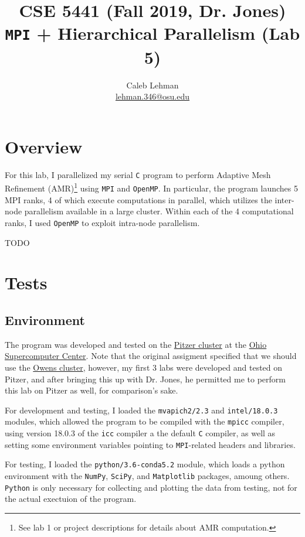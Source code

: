 \documentclass{article}
\title{\vspace{-2em}
CSE 5441 (Fall 2019, Dr. Jones)\\
\large \texttt{MPI} + Hierarchical Parallelism (Lab 5)
}
\author{
Caleb Lehman \\
\href{mailto:lehman.346@osu.edu}{lehman.346@osu.edu}
}
\begin{document}
\maketitle

\section*{Overview}
\label{sec:overview}

For this lab, I parallelized my serial \texttt{C} program to perform Adaptive
Mesh Refinement (AMR)\footnote{See lab 1 or project descriptions for details
about AMR computation.} using \texttt{MPI} and \texttt{OpenMP}. In particular,
the program launches 5 MPI ranks, 4 of which execute computations in parallel,
which utilizes the inter-node parallelism available in a large cluster. Within
each of the 4 computational ranks, I used \texttt{OpenMP} to exploit intra-node
parallelism.

TODO

\section*{Tests}
\label{sec:tests}

\subsection*{Environment}
\label{subsec:environment}

The program was developed and tested on the
\href{https://www.osc.edu/resources/technical_support/supercomputers/pitzer}{Pitzer
cluster} at the \href{https://www.osc.edu/}{Ohio Supercomputer Center}. Note that
the original assigment specified that we should use the
\href{https://www.osc.edu/resources/technical_support/supercomputers/owens}{Owens
cluster}, however, my first 3 labs were developed and tested on Pitzer, and after
bringing this up with Dr. Jones, he permitted me to perform this lab on Pitzer as
well, for comparison's sake.

For development and testing, I loaded the \texttt{mvapich2/2.3} and \texttt{intel/18.0.3} modules, which
allowed the program to be compiled with the \texttt{mpicc} compiler, using version 18.0.3 of the \texttt{icc}
compiler a the default \texttt{C} compiler, as well as setting some environment variables pointing to
\texttt{MPI}-related headers and libraries.

For testing, I loaded the \texttt{python/3.6-conda5.2} module, which loads a
python environment with the \texttt{NumPy}, \texttt{SciPy}, and
\texttt{Matplotlib} packages, amoung others. \texttt{Python} is only necessary
for collecting and plotting the data from testing, not for the actual exectuion
of the program.
\end{document}
